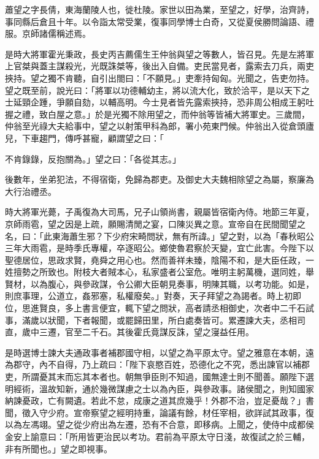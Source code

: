
\begin{pinyinscope}
蕭望之字長倩，東海蘭陵人也，徙杜陵。家世以田為業，至望之，好學，治齊詩，事同縣后倉且十年。以令詣太常受業，復事同學博士白奇，又從夏侯勝問論語、禮服。京師諸儒稱述焉。

是時大將軍霍光秉政，長史丙吉薦儒生王仲翁與望之等數人，皆召見。先是左將軍上官桀與蓋主謀殺光，光既誅桀等，後出入自備。吏民當見者，露索去刀兵，兩吏挾持。望之獨不肯聽，自引出閤曰：「不願見。」吏牽持匈匈。光聞之，告吏勿持。望之既至前，說光曰：「將軍以功德輔幼主，將以流大化，致於洽平，是以天下之士延頸企踵，爭願自劾，以輔高明。今士見者皆先露索挾持，恐非周公相成王躬吐握之禮，致白屋之意。」於是光獨不除用望之，而仲翁等皆補大將軍史。三歲間，仲翁至光祿大夫給事中，望之以射策甲科為郎，署小苑東門候。仲翁出入從倉頭廬兒，下車趨門，傳呼甚寵，顧謂望之曰：「

不肯錄錄，反抱關為。」望之曰：「各從其志。」

後數年，坐弟犯法，不得宿衛，免歸為郡吏。及御史大夫魏相除望之為屬，察廉為大行治禮丞。

時大將軍光薨，子禹復為大司馬，兄子山領尚書，親屬皆宿衛內侍。地節三年夏，京師雨雹，望之因是上疏，願賜清閒之宴，口陳災異之意。宣帝自在民間聞望之名，曰：「此東海蕭生邪？下少府宋畸問狀，無有所諱。」望之對，以為「春秋昭公三年大雨雹，是時季氏專權，卒逐昭公。鄉使魯君察於天變，宜亡此害。今陛下以聖德居位，思政求賢，堯舜之用心也。然而善祥未臻，陰陽不和，是大臣任政，一姓擅勢之所致也。附枝大者賊本心，私家盛者公室危。唯明主躬萬機，選同姓，舉賢材，以為腹心，與參政謀，令公卿大臣朝見奏事，明陳其職，以考功能。如是，則庶事理，公道立，姦邪塞，私權廢矣。」對奏，天子拜望之為謁者。時上初即位，思進賢良，多上書言便宜，輒下望之問狀，高者請丞相御史，次者中二千石試事，滿歲以狀聞，下者報聞，或罷歸田里，所白處奏皆可。累遷諫大夫，丞相司直，歲中三遷，官至二千石。其後霍氏竟謀反誅，望之寖益任用。

是時選博士諫大夫通政事者補郡國守相，以望之為平原太守。望之雅意在本朝，遠為郡守，內不自得，乃上疏曰：「陛下哀愍百姓，恐德化之不究，悉出諫官以補郡吏，所謂憂其末而忘其本者也。朝無爭臣則不知過，國無達士則不聞善。願陛下選明經術，溫故知新，通於幾微謀慮之士以為內臣，與參政事。諸侯聞之，則知國家納諫憂政，亡有闕遺。若此不怠，成康之道其庶幾乎！外郡不治，豈足憂哉？」書聞，徵入守少府。宣帝察望之經明持重，論議有餘，材任宰相，欲詳試其政事，復以為左馮翊。望之從少府出為左遷，恐有不合意，即移病。上聞之，使侍中成都侯金安上諭意曰：「所用皆更治民以考功。君前為平原太守日淺，故復試之於三輔，非有所聞也。」望之即視事。


\end{pinyinscope}
